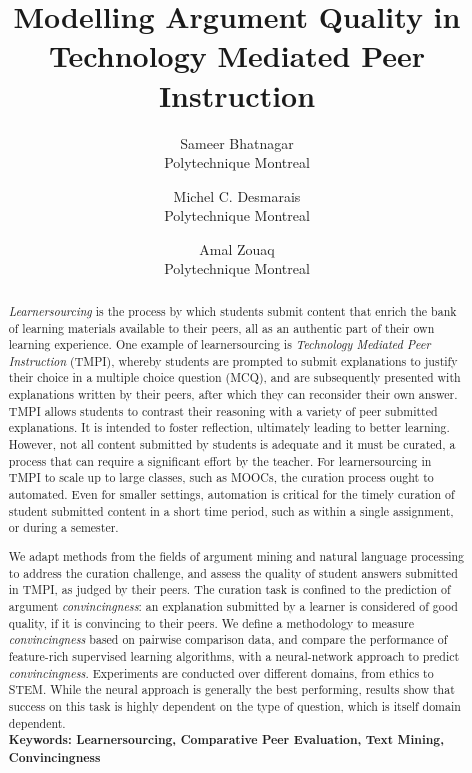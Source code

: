 \documentclass[notitlepage,12pt]{jedm}
\begin{document}
	
	\title{Modelling Argument Quality in Technology Mediated Peer Instruction}
	\date{} %
	
	\author{
		{\large Sameer Bhatnagar}
		\\Polytechnique Montreal
	 	\and 
	 	{\large Michel C. Desmarais}
	 	\\Polytechnique Montreal
	 	\and 
	 	{\large Amal Zouaq}
 		\\Polytechnique Montreal
 }

	
	\maketitle
	
	\begin{abstract}
	\textit{Learnersourcing} is the process by which students submit content 
	that enrich the bank of learning materials available to their peers, all as 
	an 	authentic part of their own learning experience.  
	One example of learnersourcing is \textit{Technology Mediated Peer 
	Instruction} (TMPI), whereby students are prompted to submit explanations 
	to justify their choice in a multiple choice question (MCQ), and are 
	subsequently presented with explanations written by their peers, after 
	which they can reconsider their own answer.  
	TMPI allows students to contrast their reasoning with a variety of peer 
	submitted explanations. 
	It is intended to foster reflection, ultimately leading to better 
	learning.  
	However, not all content submitted by students is adequate and it must be 
	curated, a process that can require a significant effort by the teacher.  
	For learnersourcing in TMPI to scale up to large classes, such as MOOCs, 
	the curation process ought to automated.  
	Even for smaller settings, automation is critical for the timely curation 
	of student submitted content in a short time period, such as within a 
	single assignment, or during a semester.
	
	We adapt methods from the fields of argument mining and natural language 
	processing to address the curation challenge, and assess the quality of 
	student answers submitted in TMPI, as judged by their peers.  
	The curation task is confined to the prediction of argument 
	\textit{convincingness}: an explanation submitted by a learner is 
	considered of good quality, if it is convincing to their peers.  
	We define a methodology to measure \textit{convincingness} based on 
	pairwise comparison data, and compare the performance of feature-rich 
	supervised learning algorithms, with a neural-network approach to predict 
	\textit{convincingness}.
	Experiments are conducted over different domains, from ethics to STEM.  
	While the neural approach is generally the best performing, results show 
	that success on this task is highly dependent on the type of question, 
	which is itself domain dependent.
	\\ %
		{\parindent0pt
			\textbf{Keywords: Learnersourcing, Comparative Peer Evaluation, 
			Text Mining, Convincingness} 
		}
	\end{abstract}
\end{document}
